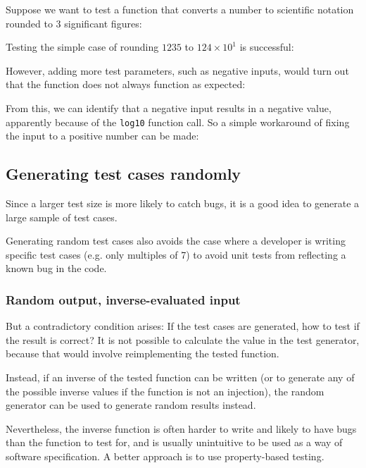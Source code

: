 Suppose we want to test a function that converts a number to scientific notation rounded to 3 significant figures:


Testing the simple case of rounding $1235$ to $124\times10^1$ is successful:


However, adding more test parameters, such as negative inputs, would turn out that the function does not always function as expected:


From this, we can identify that a negative input results in a negative value, apparently because of the \texttt{log10} function call.
So a simple workaround of fixing the input to a positive number can be made:


\subsection{Generating test cases randomly}
Since a larger test size is more likely to catch bugs, it is a good idea to generate a large sample of test cases.

Generating random test cases also avoids the case where a developer is writing specific test cases (e.g. only multiples of 7)
to avoid unit tests from reflecting a known bug in the code.

\subsubsection{Random output, inverse-evaluated input}
But a contradictory condition arises: If the test cases are generated, how to test if the result is correct?
It is not possible to calculate the value in the test generator, because that would involve reimplementing the tested function.

Instead, if an inverse of the tested function can be written
(or to generate any of the possible inverse values if the function is not an injection),
the random generator can be used to generate random results instead.

Nevertheless, the inverse function is often harder to write and likely to have bugs than the function to test for,
and is usually unintuitive to be used as a way of software specification.
A better approach is to use property-based testing.

